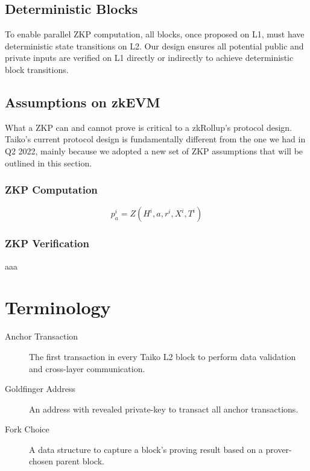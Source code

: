 \documentclass[9pt,oneside]{amsart}
\begin{document}
\begin{multicols}{2}
\subsection{Deterministic Blocks}
To enable parallel ZKP computation, all blocks, once proposed on L1, must have deterministic state transitions on L2. Our design ensures all potential public and private inputs are verified on L1 directly or indirectly to achieve deterministic block transitions.

\subsection{Assumptions on zkEVM}

What a ZKP can and cannot prove is critical to a zkRollup's protocol design. Taiko's current protocol design is fundamentally different from the one we had in Q2 2022, mainly because we adopted a new set of ZKP assumptions that will be outlined in this section.


\subsubsection{ZKP Computation}

$$ p^i_a = Z(H^i, a, r^i, X^i, T^i) $$


\subsubsection{ZKP Verification}

aaa

\end{multicols}




\appendix

\section{Terminology} \label{ch:Terminology}

\begin{description}
\item[Anchor Transaction] The first transaction in every Taiko L2 block to perform data validation and cross-layer communication.

\item[Goldfinger Address] An address with revealed private-key to transact all anchor transactions.

\item[Fork Choice] A data structure to capture a block's proving result based on a prover-chosen parent block.

\end{description}
\end{document}

